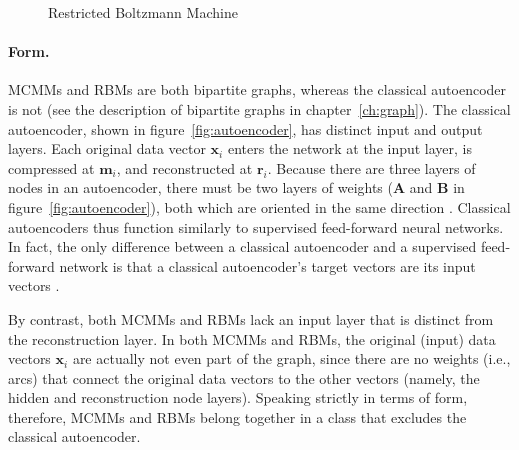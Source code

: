 \begin{figure}[t]
\begin{mdframed}
\caption{Restricted Boltzmann Machine} 
\label{fig:rbm}
\vspace{12pt}
\end{mdframed}
\end{figure}

\paragraph{Form.}
MCMMs and RBMs are both bipartite graphs, whereas the classical autoencoder is 
not (see the description of bipartite graphs in chapter~\ref{ch:graph}).
The classical autoencoder, shown in figure~\ref{fig:autoencoder}, has distinct input 
and output layers.
Each original data vector $\textbf{x}_i$ enters the network at the input layer, is compressed 
at $\textbf{m}_i$, and reconstructed at $\textbf{r}_i$. Because there are three layers 
of nodes in an autoencoder, there must be two layers of weights ($\textbf{A}$ and $\textbf{B}$ in figure~\ref{fig:autoencoder}), both which are oriented in the same direction \citep{baldi:2012}.
Classical autoencoders thus function similarly to supervised feed-forward neural networks. 
In fact, the only difference between a classical autoencoder and a supervised 
feed-forward network is that a classical autoencoder's target vectors are its input vectors \citep{bourlard:1988}. 

By contrast, both MCMMs and RBMs lack an input layer that is distinct from the reconstruction layer. 
In both MCMMs and RBMs,
the original (input) data vectors $\textbf{x}_i$ are actually not even part of the graph, 
since there are no weights (i.e., arcs) that connect the original data vectors to the other 
vectors (namely, the hidden and reconstruction node layers). %
Speaking strictly in terms of form, therefore, MCMMs and RBMs belong together in a 
class that excludes the classical autoencoder.

